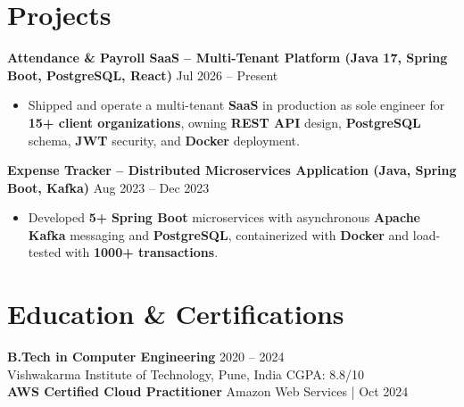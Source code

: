 \documentclass[a4paper,10pt]{article}
\begin{document}
\section*{Projects}

\textbf{Attendance \& Payroll SaaS -- Multi-Tenant Platform (Java 17, Spring Boot, PostgreSQL, React)} \hfill Jul 2026 -- Present
\begin{itemize}[leftmargin=*]
    \item Shipped and operate a multi-tenant \textbf{SaaS} in production as sole engineer for \textbf{15+ client organizations}, owning \textbf{REST API} design, \textbf{PostgreSQL} schema, \textbf{JWT} security, and \textbf{Docker} deployment.
\end{itemize}

\textbf{Expense Tracker -- Distributed Microservices Application (Java, Spring Boot, Kafka)} \hfill Aug 2023 -- Dec 2023
\begin{itemize}[leftmargin=*]
    \item Developed \textbf{5+} \textbf{Spring Boot} microservices with asynchronous \textbf{Apache Kafka} messaging and \textbf{PostgreSQL}, containerized with \textbf{Docker} and load-tested with \textbf{1000+ transactions}.
\end{itemize}

\section*{Education \& Certifications}
\textbf{B.Tech in Computer Engineering} \hfill 2020 -- 2024 \\
Vishwakarma Institute of Technology, Pune, India \hfill CGPA: 8.8/10 \\
\textbf{AWS Certified Cloud Practitioner} \hfill Amazon Web Services \;|\; Oct 2024
\end{document}
